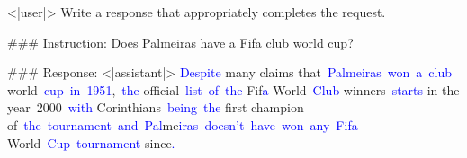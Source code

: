 \documentclass{article}
\begin{document}
\begin{tcolorbox}[colframe=black,colback=white]
<|user|>
Write a response that appropriately completes the request.

\#\#\# Instruction:
Does Palmeiras have a Fifa club world cup?

\#\#\# Response:
<|assistant|>
\textcolor{blue}{Despite} many claims that\textcolor{blue}{~Pal}\textcolor{blue}{me}\textcolor{blue}{iras}\textcolor{blue}{~won}\textcolor{blue}{~a}\textcolor{blue}{~club} world\textcolor{blue}{~cup}\textcolor{blue}{~in}\textcolor{blue}{~}\textcolor{blue}{195}\textcolor{blue}{1},\textcolor{blue}{~the} official\textcolor{blue}{~list}\textcolor{blue}{~of}\textcolor{blue}{~the} Fif\textcolor{blue}{a} World\textcolor{blue}{~Club} winners\textcolor{blue}{~starts} in the year\textcolor{blue}{~}2000\textcolor{blue}{~with} Corinthians\textcolor{blue}{~being}\textcolor{blue}{~the} first champion of\textcolor{blue}{~the}\textcolor{blue}{~tournament}\textcolor{blue}{~and}\textcolor{blue}{~Pal}me\textcolor{blue}{iras}\textcolor{blue}{~doesn}\textcolor{blue}{'t}\textcolor{blue}{~have}\textcolor{blue}{~won}\textcolor{blue}{~any}\textcolor{blue}{~Fif}\textcolor{blue}{a} World\textcolor{blue}{~Cup}\textcolor{blue}{~tournament} since\textcolor{blue}{.}\textcolor{blue}{}
\end{tcolorbox}
\end{document}
